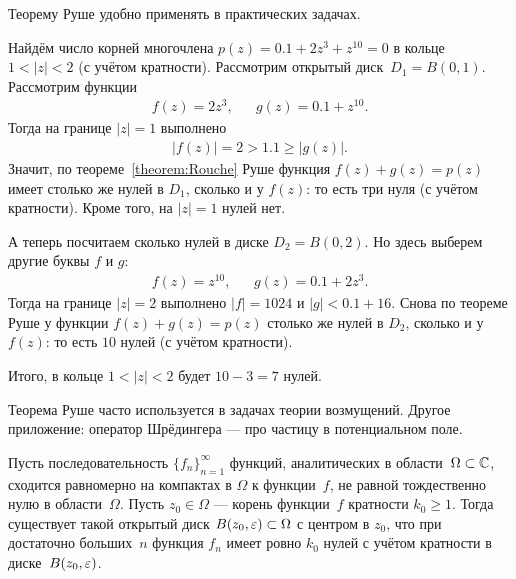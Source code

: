 \documentclass[../complex-analysis.tex]{subfiles}
\begin{document}
Теорему Руше удобно применять в практических задачах.

\begin{exmpl}
 Найдём число корней многочлена $ p(z) = 0.1+2z^{3} + z^{10} = 0 $ в кольце~$ 1 < \left| z \right|  < 2 $ (с учётом кратности). Рассмотрим открытый диск~$ D_1 = B(0,1) $. Рассмотрим функции
 \begin{align*}
  f(z) = 2z^{3}, &&g(z) = 0.1 + z^{10}.
 \end{align*} Тогда на границе $ \left| z \right|=1 $ выполнено
 \begin{align*}
  \left| f(z) \right| = 2 > 1.1 \geqslant \left| g(z) \right|.
 \end{align*} Значит, по теореме~\ref{theorem:Rouche} Руше функция $f(z) + g(z) = p(z)$
 имеет столько же нулей в $ D_1 $, сколько и у $ f(z) $: то есть три нуля (с учётом кратности). Кроме того, на $ \left| z \right| = 1 $ нулей нет.

 А теперь посчитаем сколько нулей в диске $ D_2 =B(0,2) $. Но здесь выберем другие буквы $ f $ и $ g $:
 \begin{align*}
  f(z) = z^{10}, && g(z) = 0.1  + 2z^{3}.
 \end{align*} Тогда на границе $ \left| z \right|=2 $ выполнено $ \left| f \right| = 1024 $ и $ \left| g \right| < 0.1 + 16 $. Снова по теореме Руше у функции $ f(z)+g(z) = p(z) $ столько же нулей в $ D_2 $, сколько и у $ f(z) $: то есть $ 10 $ нулей (с учётом кратности).

 Итого, в кольце $ 1 < \left| z \right| < 2 $ будет $ 10-3 = 7 $ нулей.
\end{exmpl}

Теорема Руше часто используется в задачах теории возмущений. Другое приложение: оператор Шрёдингера --- про частицу в потенциальном поле.

\begin{crly}
 \label{corollary:Gurovitz}
 Пусть последовательность $ \{f_{n}\}_{n=1}^{\infty}  $ функций, аналитических в области~$ \Omega \subset \mathbb{C} $, сходится равномерно на компактах в $ \Omega $ к функции~$ f $, не равной тождественно нулю в области~$ \Omega $. Пусть $ z_0 \in \Omega $ --- корень функции~$ f $ кратности $ k_0 \geqslant 1 $. Тогда существует такой открытый диск $ B(z_0,\varepsilon) \subset \Omega $ с центром в $ z_0 $, что при достаточно больших~$ n $ функция $ f_n $ имеет ровно $ k_0 $ нулей с учётом кратности в диске~$ B(z_0,\varepsilon) $.
\end{crly}
\end{document}
